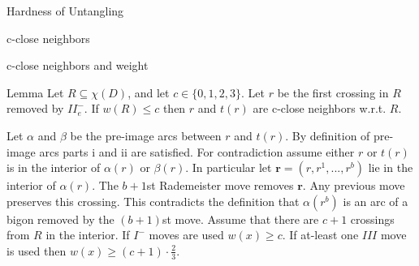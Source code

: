 \documentclass{beamer}
\begin{document}
\begin{section}{Hardness of Untangling}
\begin{frame}{c-close neighbors}
    \end{frame}
    
    \begin{frame}{c-close neighbors and weight}
    
    \begin{block}{Lemma}
        Let $R \subseteq \chi(D)$, and let $c\in \{0,1,2,3\}$. Let $r$ be the first crossing in $R$ removed by $II^-_e$. If $w(R)\leq c$ then $r$ and $t(r)$ are c-close neighbors w.r.t. $R$.
    \end{block}{}
        \newline
        Let $\alpha$ and $\beta$ be the pre-image arcs between $r$ and $t(r)$. By definition of pre-image arcs parts i and ii are satisfied. 
        \newline
        \newline
        For contradiction assume either $r$ or $t(r)$ is in the interior of $\alpha(r)$ or $\beta(r)$. In particular let $\mathbf{r} = (r, r^1,...,r^b)$ lie in the interior of $\alpha(r)$. The $b+1$st Rademeister move removes $\mathbf{r}$. Any previous move preserves this crossing. This contradicts the definition that $\alpha(r^b)$ is an arc of a bigon removed by the $(b+1)$st move. 
        \newline
        \newline
        Assume that there are $c+1$ crossings from $R$ in the interior. If $I^-$ moves are used $w(x)\geq c$. If at-least one $III$ move is used then $w(x) \geq (c+1)\cdot \frac{2}{3}$.
    
        
    \end{frame}
    

\end{section}
\end{document}
